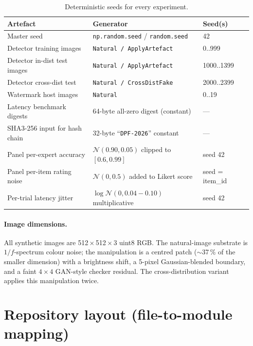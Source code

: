 \documentclass[11pt,a4paper]{article}
\begin{document}
\begin{table}[!ht]\centering
\caption{Deterministic seeds for every experiment.}\label{tab:seeds}
\small
\begin{tabular}{l l l}
\toprule
Artefact & Generator & Seed(s) \\
\midrule
Master seed                  & \texttt{np.random.seed} / \texttt{random.seed} & 42 \\
Detector training images     & \texttt{Natural / ApplyArtefact}               & 0..999 \\
Detector in-dist test images & \texttt{Natural / ApplyArtefact}               & 1000..1399 \\
Detector cross-dist test     & \texttt{Natural / CrossDistFake}               & 2000..2399 \\
Watermark host images        & \texttt{Natural}                               & 0..19 \\
Latency benchmark digests    & 64-byte all-zero digest (constant)             & --- \\
SHA3-256 input for hash chain& 32-byte ``\texttt{DPF-2026}'' constant         & --- \\
Panel per-expert accuracy    & $\mathcal{N}(0.90, 0.05)$ clipped to $[0.6, 0.99]$ & seed 42 \\
Panel per-item rating noise  & $\mathcal{N}(0, 0.5)$ added to Likert score    & seed = item\_id \\
Per-trial latency jitter     & $\log\mathcal{N}(0, 0.04\!-\!0.10)$ multiplicative & seed 42 \\
\bottomrule
\end{tabular}
\end{table}

\paragraph{Image dimensions.}
All synthetic images are 512\,$\times$\,512\,$\times$\,3 uint8 RGB.
The natural-image substrate is $1/f$-spectrum colour noise; the
manipulation is a centred patch ($\sim$37\,\% of the smaller
dimension) with a brightness shift, a 5-pixel Gaussian-blended
boundary, and a faint $4\!\times\!4$ GAN-style checker residual.
The cross-distribution variant applies this manipulation twice.

\section{Repository layout (file-to-module mapping)}\label{sec:repo}
\end{document}

